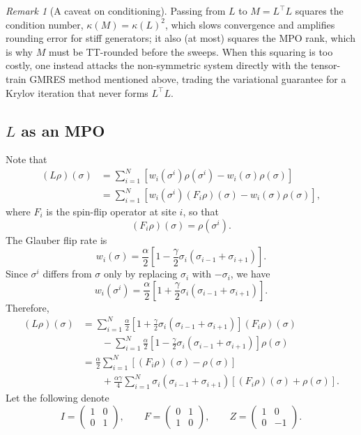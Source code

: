 \documentclass[12pt]{article}
\theoremstyle{definition}
\theoremstyle{remark}
\newtheorem{remark}[theorem]{Remark}
\begin{document}
\begin{remark}[A caveat on conditioning]
Passing from $L$ to $M = L^\top L$ squares the condition number, $\kappa(M) = \kappa(L)^2$, which slows convergence and amplifies rounding error for stiff generators; it also (at most) squares the MPO rank, which is why $M$ must be TT-rounded before the sweeps. When this squaring is too costly, one instead attacks the non-symmetric system directly with the tensor-train GMRES method mentioned above, trading the variational guarantee for a Krylov iteration that never forms $L^\top L$.
\end{remark}
\subsection{$L$ as an MPO}\label{sec:glauber-mpo}
Note that 
\begin{align*}
(L\rho)(\sigma)
&= \sum_{i=1}^N
\left[
w_i(\sigma^i)\rho(\sigma^i)
-
w_i(\sigma)\rho(\sigma)
\right] \\[4pt]
&= \sum_{i=1}^N
\left[
w_i(\sigma^i)(F_i\rho)(\sigma)
-
w_i(\sigma)\rho(\sigma)
\right],
\end{align*}
where \(F_i\) is the spin-flip operator at site \(i\), so that
\[
(F_i\rho)(\sigma)=\rho(\sigma^i).
\]
The Glauber flip rate is
\[
w_i(\sigma)
=
\frac{\alpha}{2}
\left[
1-\frac{\gamma}{2}\sigma_i(\sigma_{i-1}+\sigma_{i+1})
\right].
\]
Since \(\sigma^i\) differs from \(\sigma\) only by replacing \(\sigma_i\) with \(-\sigma_i\), we have
\[
w_i(\sigma^i)
=
\frac{\alpha}{2}
\left[
1+\frac{\gamma}{2}\sigma_i(\sigma_{i-1}+\sigma_{i+1})
\right].
\]
Therefore,
\begin{align*}
(L\rho)(\sigma)
&=
\sum_{i=1}^N
\frac{\alpha}{2}
\left[
1+\frac{\gamma}{2}\sigma_i(\sigma_{i-1}+\sigma_{i+1})
\right]
(F_i\rho)(\sigma) \\[4pt]
&\qquad
-
\sum_{i=1}^N
\frac{\alpha}{2}
\left[
1-\frac{\gamma}{2}\sigma_i(\sigma_{i-1}+\sigma_{i+1})
\right]
\rho(\sigma) \\[4pt]
&=
\frac{\alpha}{2}
\sum_{i=1}^N
\left[
(F_i\rho)(\sigma)-\rho(\sigma)
\right] \\[4pt]
&\qquad
+
\frac{\alpha\gamma}{4}
\sum_{i=1}^N
\sigma_i(\sigma_{i-1}+\sigma_{i+1})
\left[
(F_i\rho)(\sigma)+\rho(\sigma)
\right].
\end{align*}
Let the following denote 
\[
I=
\begin{pmatrix}
1&0\\
0&1
\end{pmatrix},
\qquad
F=
\begin{pmatrix}
0&1\\
1&0
\end{pmatrix},
\qquad
Z=
\begin{pmatrix}
1&0\\
0&-1
\end{pmatrix}.
\]
\end{document}
